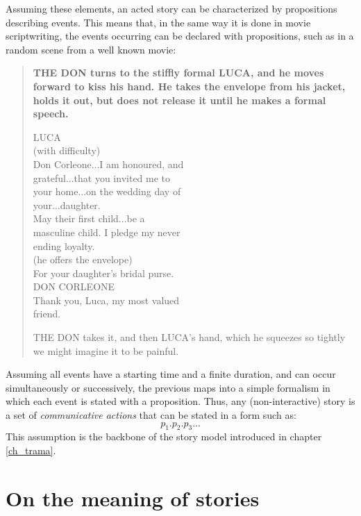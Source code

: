 \documentclass[
		twoside,openright,titlepage,numbers=noenddot,manychapters,
		headinclude,%
                footinclude=false,cleardoublepage=empty,
                BCOR=5mm,
		fontsize=11pt, %
                 enabledeprecatedfontcommands]{scrreprt}
\begin{document}
Assuming these elements, an acted story can be characterized by propositions describing events. This means that, in the same way it is done in movie scriptwriting, the events occurring can be declared with propositions, such as in a random scene from a well known movie:
\begin{quote}
\begin{small}\bf
THE DON turns to the stiffly formal LUCA, and he moves 
	forward to kiss his hand.  He takes the envelope from his
	jacket, holds it out, but does not release it until he makes
	a formal speech.
\begin{center}
				LUCA\\
			  (with difficulty)\\
		Don Corleone...I am honoured, and\\
		grateful...that you invited me to\\
		your home...on the wedding day of\\
		your...daughter.\\
		May their first child...be a\\
		masculine child.  I pledge my never\\
		ending loyalty.\\
			  (he offers the envelope)\\
		For your daughter's bridal purse.\\


				DON CORLEONE\\
		Thank you, Luca, my most valued\\
		friend.\\\end{center}
	THE DON takes it, and then LUCA's hand, which he squeezes so
	tightly we might imagine it to be painful.
\end{small}
\end{quote}
Assuming all events have a starting time and a finite duration, and can occur simultaneously or successively, the previous maps into a simple formalism in which each event is stated with a proposition. Thus, any (non-interactive) story is a set of \emph{communicative actions} that can be stated in a form such as:
\begin{equation*}\label{}
    p_1. p_2. p_3 ...
\end{equation*}
This assumption is the backbone of the story model introduced in chapter \ref{ch_trama}.





\section{On the meaning of stories}
\end{document}
